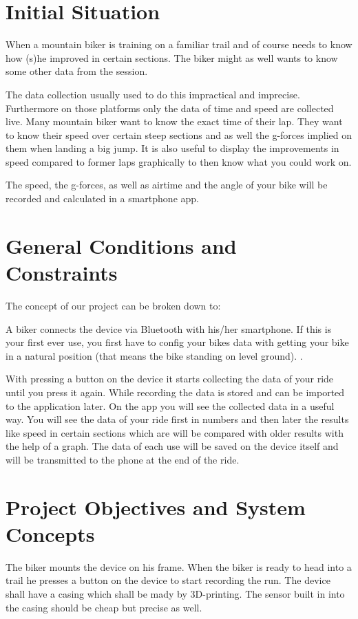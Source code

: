 \documentclass[12pt]{article}
\theoremstyle{definition}
\begin{document}
\section{Initial Situation}
When a mountain biker is training on a familiar trail and of course needs to know how (s)he improved in certain sections. The biker might as well wants to know some other data from the session. 

The data collection usually used to do this impractical and imprecise. Furthermore on those platforms only the data of time and speed are collected live. Many mountain biker want to know the exact time of their lap. They want to know their speed over certain steep sections and as well the g-forces implied on them when landing a big jump. It is also useful to display the improvements in speed compared to former laps graphically to then know what you could work on. 

The speed, the g-forces, as well as airtime and the angle of your bike will be recorded and calculated in a smartphone app.
\pagebreak

\section{General Conditions and Constraints}
The concept of our project can be broken down to: 

A biker connects the device via Bluetooth with his/her smartphone. If this is your first ever use, you first have to config your bikes data with getting your bike in a natural position (that means the bike standing on level ground).
. 

With pressing  a button on the device  it starts collecting the data of your ride until you press it again. 
While recording the data is stored and can be imported to the application later.
On the app you will see the collected data in a useful way. You will see the data of your ride first in numbers and then later the results like speed in certain sections which are will be compared with older results with the help of a graph. 
The data of each use will be saved on the device itself and will be transmitted to the phone at the end of the ride.

\pagebreak

\section{Project Objectives and System Concepts}
The biker mounts the device on his frame. When the biker is ready to head into a trail he presses a button on the device to start recording the run. The device shall have a casing which shall be mady by 3D-printing. The sensor built in into the casing should be cheap but precise as well.
\end{document}
